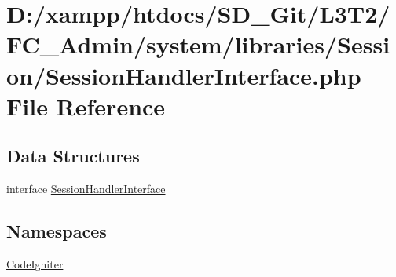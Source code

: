 \hypertarget{_admin_2system_2libraries_2_session_2_session_handler_interface_8php}{}\section{D\+:/xampp/htdocs/\+S\+D\+\_\+\+Git/\+L3\+T2/\+F\+C\+\_\+\+Admin/system/libraries/\+Session/\+Session\+Handler\+Interface.php File Reference}
\label{_admin_2system_2libraries_2_session_2_session_handler_interface_8php}
\subsection*{Data Structures}
\begin{DoxyCompactItemize}
\item 
interface \hyperlink{interface_session_handler_interface}{Session\+Handler\+Interface}
\end{DoxyCompactItemize}
\subsection*{Namespaces}
\begin{DoxyCompactItemize}
\item 
 \hyperlink{namespace_code_igniter}{Code\+Igniter}
\end{DoxyCompactItemize}
